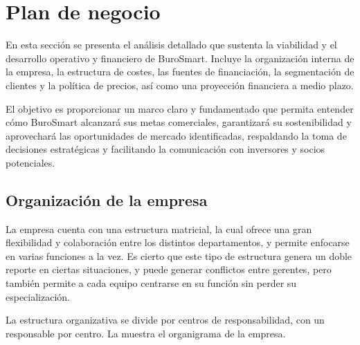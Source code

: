 \section{Plan de negocio}
En esta sección se presenta el análisis detallado que sustenta la viabilidad y el desarrollo operativo y financiero de BuroSmart. Incluye la organización interna de la empresa, la estructura de costes, las fuentes de financiación, la segmentación de clientes y la política de precios, así como una proyección financiera a medio plazo.

El objetivo es proporcionar un marco claro y fundamentado que permita entender cómo BuroSmart alcanzará sus metas comerciales, garantizará su sostenibilidad y aprovechará las oportunidades de mercado identificadas, respaldando la toma de decisiones estratégicas y facilitando la comunicación con inversores y socios potenciales.

\subsection{Organización de la empresa}
La empresa cuenta con una estructura matricial, la cual ofrece una gran flexibilidad y colaboración entre los distintos departamentos, y permite enfocarse en varias funciones a la vez. Es cierto que este tipo de estructura genera un doble reporte en ciertas situaciones, y puede generar conflictos entre gerentes, pero también permite a cada equipo centrarse en su función sin perder su especialización.

La estructura organizativa se divide por centros de responsabilidad, con un responsable por centro. La  muestra el organigrama de la empresa.



